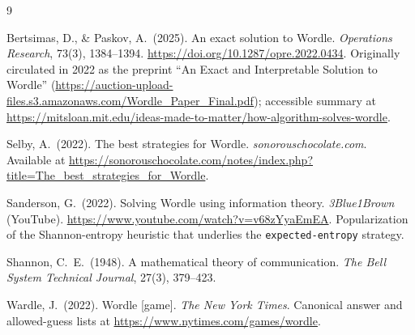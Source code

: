 \documentclass[11pt]{article}
\begin{document}

\renewcommand{\refname}{References}

\begin{thebibliography}{9}
\small
\raggedright

Bertsimas, D., \& Paskov, A.~(2025).
\newblock An exact solution to Wordle.
\newblock \emph{Operations Research}, 73(3), 1384--1394.
\newblock \url{https://doi.org/10.1287/opre.2022.0434}.
\newblock Originally circulated in 2022 as the preprint
``An Exact and Interpretable Solution to Wordle''
(\url{https://auction-upload-files.s3.amazonaws.com/Wordle_Paper_Final.pdf});
accessible summary at
\url{https://mitsloan.mit.edu/ideas-made-to-matter/how-algorithm-solves-wordle}.

Selby, A.~(2022).
\newblock The best strategies for Wordle.
\newblock \emph{sonorouschocolate.com}. Available at
\url{https://sonorouschocolate.com/notes/index.php?title=The_best_strategies_for_Wordle}.

Sanderson, G.~(2022).
\newblock Solving Wordle using information theory.
\newblock \emph{3Blue1Brown} (YouTube).
\newblock \url{https://www.youtube.com/watch?v=v68zYyaEmEA}.
\newblock Popularization of the Shannon-entropy heuristic that
underlies the \texttt{expected-entropy} strategy.

Shannon, C.~E.~(1948).
\newblock A mathematical theory of communication.
\newblock \emph{The Bell System Technical Journal}, 27(3), 379--423.

Wardle, J.~(2022).
\newblock Wordle [game].
\newblock \emph{The New York Times}. Canonical answer and allowed-guess lists
at \url{https://www.nytimes.com/games/wordle}.

\end{thebibliography}
\end{document}
